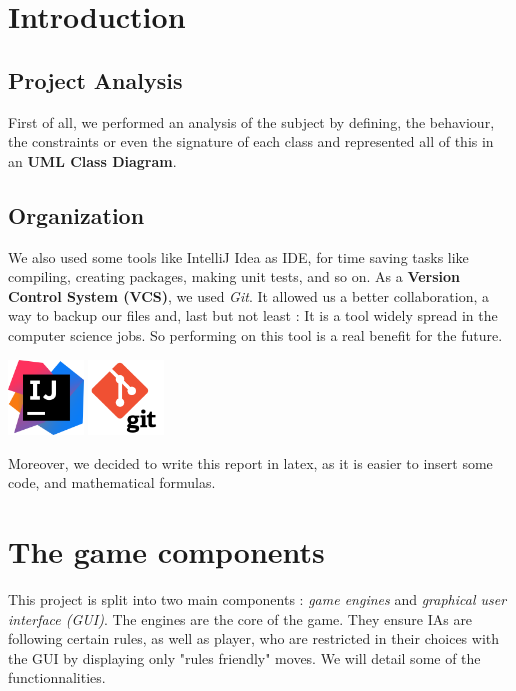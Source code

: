 \documentclass[english, 11pt, titlepage]{article}
\begin{document}

    \pagebreak

    \pagebreak
    \section{Introduction}
    \subsection{Project Analysis}
    First of all, we performed an analysis of the subject by defining, the behaviour, the constraints or even the signature of each class and represented all of this in an \textbf{UML Class Diagram}.
    \subsection{Organization}
    We also used some tools like IntelliJ Idea as IDE, for time saving tasks like compiling, creating packages, making unit tests, and so on. As a \textbf{Version Control System (VCS)}, we used \emph{Git}. It allowed us a better collaboration, a way to backup our files and, last but not least : It is a tool widely spread in the computer science jobs. So performing on this tool is a real benefit for the future.

    \begin{center}
        \includegraphics[width=2cm]{IntelliJ_IDEA_Icon.svg.png}
        \hspace{2cm}
        \includegraphics[width=2cm]{git.png}
    \end{center}

    Moreover, we decided to write this report in latex, as it is easier to insert some code, and mathematical formulas.


    \section{The game components}
    This project is split into two main components : \emph{game engines} and \emph{graphical user interface (GUI)}. The engines are the core of the game. They ensure IAs are following certain rules, as well as player, who are restricted in their choices with the GUI by displaying only "rules friendly" moves. We will detail some of the functionnalities.
\end{document}
